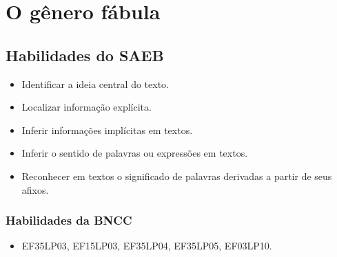 
\chapter{O gênero fábula}


\section*{Habilidades do SAEB}

\begin{itemize}
  \item Identificar a ideia central do texto.
  \item Localizar informação explícita.
  \item Inferir informações implícitas em textos.
  \item Inferir o sentido de palavras ou expressões em textos.
  \item Reconhecer em textos o significado de palavras derivadas a partir de
seus afixos.
\end{itemize}

\subsection*{Habilidades da BNCC}

\begin{itemize}
  \item EF35LP03, EF15LP03, EF35LP04, EF35LP05, EF03LP10.
\end{itemize}

